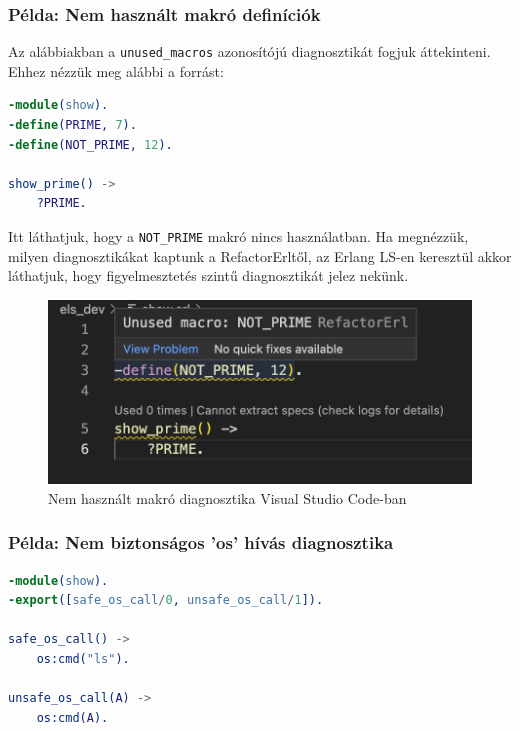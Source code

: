\subsubsection{Példa: Nem használt makró definíciók}

Az alábbiakban a \lstinline{unused_macros} azonosítójú diagnosztikát fogjuk áttekinteni. Ehhez nézzük meg alábbi a forrást:

\begin{lstlisting}[language={Erlang}]
-module(show).
-define(PRIME, 7).
-define(NOT_PRIME, 12).

show_prime() ->
    ?PRIME.
\end{lstlisting}

Itt láthatjuk, hogy a \lstinline{NOT_PRIME} makró nincs használatban. Ha megnézzük, milyen diagnosztikákat kaptunk a RefactorErltől, az Erlang LS-en keresztül akkor láthatjuk, hogy figyelmesztetés szintű diagnosztikát jelez nekünk.

\begin{figure}[H]
  \centering
  \includegraphics[width=0.7\linewidth]{images/undefined_macro.png}
  \caption{Nem használt makró diagnosztika Visual Studio Code-ban}
  \label{fig:unused_macro_vscode}
\end{figure}


\subsubsection{Példa: Nem biztonságos 'os' hívás diagnosztika}

\begin{lstlisting}[language={Erlang}] 
-module(show).
-export([safe_os_call/0, unsafe_os_call/1]).

safe_os_call() ->
    os:cmd("ls").

unsafe_os_call(A) ->
    os:cmd(A).
\end{lstlisting}

